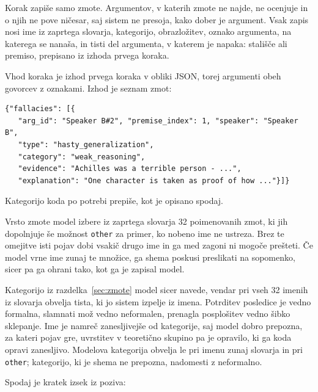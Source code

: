 \documentclass[a4paper, 12pt]{book}
\begin{document}
Korak zapiše samo zmote. Argumentov, v katerih zmote ne najde, ne ocenjuje in o
njih ne pove ničesar, saj sistem ne presoja, kako dober je argument. Vsak zapis
nosi ime iz zaprtega slovarja, kategorijo, obrazložitev, oznako argumenta, na
katerega se nanaša, in tisti del argumenta, v katerem je napaka: stališče ali
premiso, prepisano iz izhoda prvega koraka.

Vhod koraka je izhod prvega koraka v obliki JSON, torej argumenti obeh govorcev z
oznakami. Izhod je seznam zmot:

\begin{lstlisting}[basicstyle=\ttfamily\scriptsize,breaklines=true]
{"fallacies": [{
   "arg_id": "Speaker B#2", "premise_index": 1, "speaker": "Speaker B",
   "type": "hasty_generalization",
   "category": "weak_reasoning",
   "evidence": "Achilles was a terrible person - ...",
   "explanation": "One character is taken as proof of how ..."}]}
\end{lstlisting}

Kategorijo koda po potrebi prepiše, kot je opisano spodaj.

Vrsto zmote model izbere iz zaprtega slovarja 32 poimenovanih zmot, ki jih
dopolnjuje še možnost \texttt{other} za primer, ko nobeno ime ne ustreza. Brez te
omejitve isti pojav dobi vsakič drugo ime in ga med zagoni ni mogoče prešteti. Če
model vrne ime zunaj te množice, ga shema poskusi preslikati na sopomenko, sicer
pa ga ohrani tako, kot ga je zapisal model.

Kategorijo iz razdelka~\ref{sec:zmote} model sicer navede, vendar pri vseh
32 imenih iz slovarja obvelja tista, ki jo sistem izpelje iz imena.
Potrditev posledice je vedno formalna, slamnati mož vedno neformalen, prenagla
posplošitev vedno šibko sklepanje. Ime je namreč zanesljivejše od kategorije,
saj model dobro prepozna, za kateri pojav gre, uvrstitev v teoretično skupino pa
je opravilo, ki ga koda opravi zanesljivo. Modelova kategorija obvelja le pri
imenu zunaj slovarja in pri \texttt{other}; kategorijo, ki je shema ne prepozna,
nadomesti z neformalno.

Spodaj je kratek izsek iz poziva:
\end{document}

